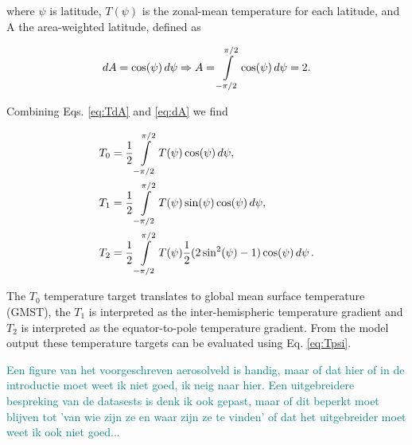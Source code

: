 \noindent where $\psi$ is latitude, $T(\psi)$ is the zonal-mean temperature for each latitude, and A the area-weighted latitude, defined as

\begin{equation}\label{eq:dA}
    \mathop{dA} = \cos(\psi) \mathop{d\psi} \Rightarrow A = \int\displaylimits_{-\pi/2}^{\pi/2} \cos(\psi) \mathop{d \psi} = 2.
\end{equation}

\noindent Combining Eqs. \ref{eq:TdA} and \ref{eq:dA} we find 

\begin{equation}\label{eq:Tpsi}
    \begin{split}
        T_0 &= \frac{1}{2} \int\displaylimits_{-\pi/2}^{\pi/2} T(\psi) \cos(\psi) \mathop{d\psi},\\
        T_1 &= \frac{1}{2} \int\displaylimits_{-\pi/2}^{\pi/2} T(\psi) \sin(\psi) \cos(\psi) \mathop{d\psi},\\
        T_2 &= \frac{1}{2} \int\displaylimits_{-\pi/2}^{\pi/2} T(\psi) \frac{1}{2}(2\sin^2(\psi) -1) \cos(\psi) \mathop{d\psi}.
    \end{split}
\end{equation}

The $T_0$ temperature target translates to global mean surface temperature (GMST), the $T_1$ is interpreted as the inter-hemispheric temperature gradient and $T_2$ is interpreted as the equator-to-pole temperature gradient. From the model output these temperature targets can be evaluated using Eq. \ref{eq:Tpsi}. 


\textcolor{teal}{Een figure van het voorgeschreven aerosolveld is handig, maar of dat hier of in de introductie moet weet ik niet goed, ik neig naar hier. Een uitgebreidere bespreking van de datasests is denk ik ook gepast, maar of dit beperkt moet blijven tot 'van wie zijn ze en waar zijn ze te vinden' of dat het uitgebreider moet weet ik ook niet goed...}